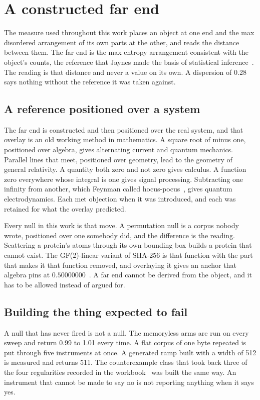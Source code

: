 \chapter{A constructed far end}

The measure used throughout this work places an object at one end and the max disordered
arrangement of its own parts at the other, and reads the distance between them. The far end is the
max entropy arrangement consistent with the object's counts, the reference that Jaynes made the
basis of statistical inference~\cite{src:Jaynes}. The reading is that distance and never a value on its
own. A dispersion of 0.28 says nothing without the reference it was taken against.

\section{A reference positioned over a system}

The far end is constructed and then positioned over the real system, and that overlay is an old working
method in mathematics. A square root of minus one, positioned over algebra, gives alternating current and
quantum mechanics. Parallel lines that meet, positioned over geometry, lead to the geometry of general
relativity. A quantity both zero and not zero gives calculus. A function zero everywhere whose
integral is one gives signal processing. Subtracting one infinity from another, which Feynman called
hocus-pocus~\cite{src:Feynman-1985}, gives quantum electrodynamics. Each met objection when it was
introduced, and each was retained for what the overlay predicted.

Every null in this work is that move. A permutation null is a corpus nobody wrote, positioned over one
somebody did, and the difference is the reading. Scattering a protein's atoms through its own bounding
box builds a protein that cannot exist. The GF(2)-linear variant of SHA-256 is that function with the
part that makes it that function removed, and overlaying it gives an anchor that algebra pins at
\(0.50000000\)~\cite{src:Quigg-sha256}. A far end cannot be derived from the object, and it has to be
allowed instead of argued for.

\section{Building the thing expected to fail}

A null that has never fired is not a null. The memoryless arms are run on every sweep and return 0.99
to 1.01 every time. A flat corpus of one byte repeated is put through five instruments at once. A
generated ramp built with a width of 512 is measured and returns 511. The counterexample class that
took back three of the four regularities recorded in the workbook~\cite{src:Quigg-orior-workbook} was
built the same way. An instrument that cannot be made to say no is not reporting anything when it says
yes.

